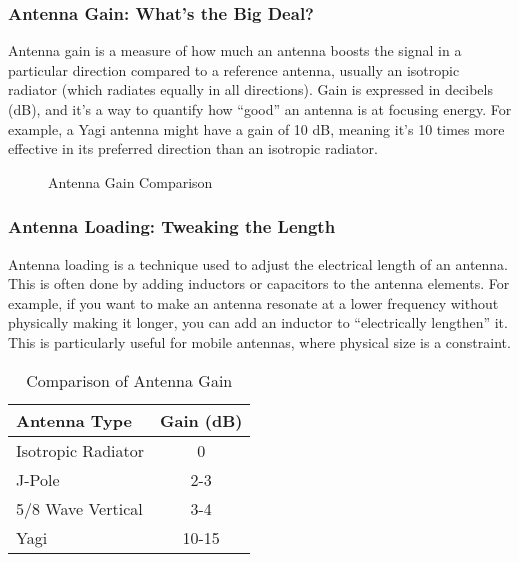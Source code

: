\subsubsection*{Antenna Gain: What’s the Big Deal?}
Antenna gain is a measure of how much an antenna boosts the signal in a particular direction compared to a reference antenna, usually an isotropic radiator (which radiates equally in all directions). Gain is expressed in decibels (dB), and it’s a way to quantify how “good” an antenna is at focusing energy. For example, a Yagi antenna might have a gain of 10 dB, meaning it’s 10 times more effective in its preferred direction than an isotropic radiator.

\begin{figure}[h]
    \centering
    \caption{Antenna Gain Comparison}
    \label{fig:antenna-gain}
\end{figure}

\subsubsection*{Antenna Loading: Tweaking the Length}
Antenna loading is a technique used to adjust the electrical length of an antenna. This is often done by adding inductors or capacitors to the antenna elements. For example, if you want to make an antenna resonate at a lower frequency without physically making it longer, you can add an inductor to “electrically lengthen” it. This is particularly useful for mobile antennas, where physical size is a constraint.

\begin{table}[h]
    \centering
    \begin{tabular}{|l|c|}
        \hline
        \textbf{Antenna Type} & \textbf{Gain (dB)} \\
        \hline
        Isotropic Radiator & 0 \\
        J-Pole & 2-3 \\
        5/8 Wave Vertical & 3-4 \\
        Yagi & 10-15 \\
        \hline
    \end{tabular}
    \caption{Comparison of Antenna Gain}
    \label{tab:antenna-gain}
\end{table}

